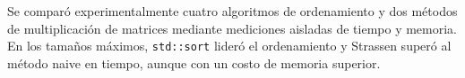 Se comparó experimentalmente cuatro algoritmos de ordenamiento y dos métodos de
multiplicación de matrices mediante mediciones aisladas de tiempo y memoria.
En los tamaños máximos, \texttt{std::sort} lideró el ordenamiento y Strassen
superó al método naive en tiempo, aunque con un costo de memoria superior.
